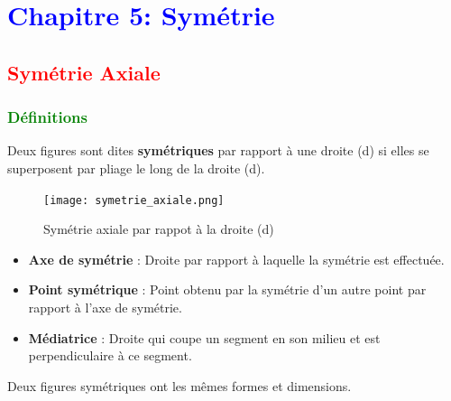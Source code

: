 \documentclass{article}
\begin{document}
\newpage
\section{\textcolor{blue}{Chapitre 5: Symétrie}}

\subsection{\textcolor{red}{Symétrie Axiale}}

\subsubsection{\textcolor{green}{Définitions}}

\begin{tcolorbox}[colback=red!10!white, colframe=red!75!black, title=\textcolor{white}{Définition :}, sharp corners=south]
     Deux figures sont dites \textbf{symétriques} par rapport à une droite (d) si elles se superposent par pliage le long de la droite (d).
\end{tcolorbox}

\begin{figure}[H]
    \centering
    \texttt{[image: symetrie\_axiale.png]}
    \caption{Symétrie axiale par rappot à la droite (d)}
    \label{fig:enter-label}
\end{figure}

\begin{tcolorbox}[colback=purple!10!white, colframe=pink!75!black, title=\textcolor{white}{Vocabulaire}, sharp corners=south]
    \begin{itemize}
        \item \textbf{Axe de symétrie} : Droite par rapport à laquelle la symétrie est effectuée.
        \item \textbf{Point symétrique} : Point obtenu par la symétrie d'un autre point par rapport à l'axe de symétrie.
        \item \textbf{Médiatrice} : Droite qui coupe un segment en son milieu et est perpendiculaire à ce segment.
    \end{itemize}
\end{tcolorbox}

\vspace{0.2cm}

\begin{tcolorbox}[colback=purple!10!white, colframe=purple!75!black, title=\textcolor{white}{Note}, sharp corners=south]
Deux figures symétriques ont les mêmes formes et dimensions.
\end{tcolorbox}
\end{document}
